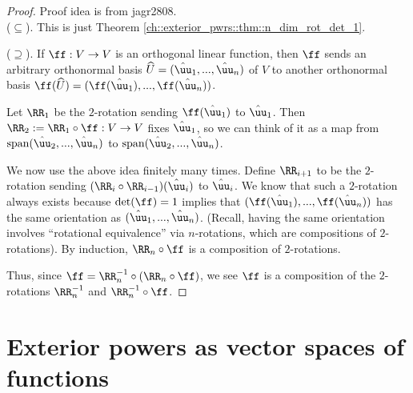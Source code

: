 \begin{proof}
    \scriptsize Proof idea is from jagr2808. 
    \fontsize{10pt}{12pt}\selectfont \\
    \indent ($\subseteq$). This is just Theorem \ref{ch::exterior_pwrs::thm::n_dim_rot_det_1}.
    
    \indent ($\supseteq$). If $\ff:V \rightarrow V$ is an orthogonal linear function, then $\ff$ sends an arbitrary orthonormal basis $\hU = (\huu_1, ..., \huu_n)$ of $V$ to another orthonormal basis $\ff(\hU) = (\ff(\huu_1), ..., \ff(\huu_n))$.

    Let $\RR_1$ be the $2$-rotation sending $\ff(\huu_1)$ to $\huu_1$. Then $\RR_2 := \RR_1 \circ \ff:V \rightarrow V$ fixes $\huu_1$, so we can think of it as a map from $\spann(\huu_2, ..., \huu_n)$ to $\spann(\huu_2, ..., \huu_n)$. 
    
    We now use the above idea finitely many times. Define $\RR_{i + 1}$ to be the $2$-rotation sending ${(\RR_i \circ \RR_{i - 1})(\huu_i)}$ to $\huu_i$. We know that such a $2$-rotation always exists because $\det(\ff) = 1$ implies that $(\ff(\huu_1), ..., \ff(\huu_n))$ has the same orientation as $(\huu_1, ..., \huu_n)$. (Recall, having the same orientation involves ``rotational equivalence'' via $n$-rotations, which are compositions of $2$-rotations). By induction, $\RR_n \circ \ff$ is a composition of $2$-rotations.
    
    Thus, since $\ff = \RR_n^{-1} \circ (\RR_n \circ \ff)$, we see $\ff$ is a composition of the $2$-rotations $\RR_n^{-1}$ and $\RR_n^{-1} \circ \ff$.
    

\end{proof}

\newpage

\section{Exterior powers as vector spaces of functions}

    
